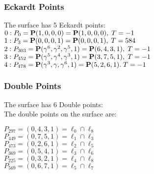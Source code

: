 \documentclass{article}
\newcommand{\bP}{{\bf P}}
\begin{document}
{\subsubsection*{Eckardt Points}
The surface has 5 Eckardt points:\\
$0 : P_{0}=\bP(1, 0, 0, 0) = \bP(1, 0, 0, 0),\; T= -1$\\
$1 : P_{3}=\bP(0, 0, 0, 1) = \bP(0, 0, 0, 1),\; T= 584$\\
$2 : P_{303}=\bP(\gamma^{6}, \gamma^{2}, \gamma^{5}, 1) = \bP(6, 4, 3, 1),\; T= -1$\\
$3 : P_{452}=\bP(\gamma^{5}, \gamma^{4}, \gamma^{3}, 1) = \bP(3, 7, 5, 1),\; T= -1$\\
$4 : P_{478}=\bP(\gamma^{3}, \gamma , \gamma^{6}, 1) = \bP(5, 2, 6, 1).\; T= -1$\\
\subsubsection*{Double Points}
The surface has 6 Double points:\\
The double points on the surface are:\\
\begin{multicols}{2}
\noindent
$P_{297} = ( 0, 4, 3, 1 ) = \ell_{0} \cap \ell_{8} $\\
$P_{449} = ( 0, 7, 5, 1 ) = \ell_{1} \cap \ell_{3} $\\
$P_{473} = ( 0, 2, 6, 1 ) = \ell_{2} \cap \ell_{5} $\\
$P_{369} = ( 0, 5, 4, 1 ) = \ell_{3} \cap \ell_{6} $\\
$P_{225} = ( 0, 3, 2, 1 ) = \ell_{4} \cap \ell_{8} $\\
$P_{569} = ( 0, 6, 7, 1 ) = \ell_{5} \cap \ell_{7} $\\
\end{multicols}
}
\end{document}
